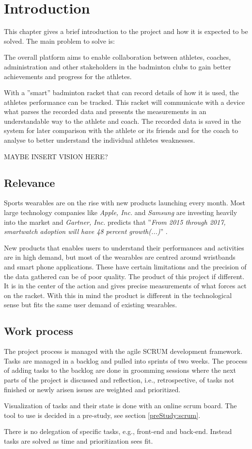 \chapter{Introduction}
This chapter gives a brief introduction to the project and how it is expected to be solved.
The main problem to solve is:


The overall platform aims to enable collaboration between athletes, coaches, administration and other stakeholders in the badminton clubs to gain better achievements and progress for the athletes.

With a ''smart'' badminton racket that can record details of how it is used, the athletes performance can be tracked. 
This racket will communicate with a device what parses the recorded data and presents the measurements in an understandable way to the athlete and coach.
The recorded data is saved in the system for later comparison with the athlete or its friends and for the coach to analyse to better understand the individual athletes weaknesses.

MAYBE INSERT VISION HERE?

\section*{Relevance}
Sports wearables are on the rise with new products launching every month. 
Most large technology companies like \textit{Apple, Inc.} and \textit{Samsung} are investing heavily into the market and \textit{Gartner, Inc.} predicts that ''\textit{From 2015 through 2017, smartwatch adoption will have 48 percent growth(...)}'' \citep{introduction:relevance:gartner}.

New products that enables users to understand their performances and activities are in high demand, but most of the wearables are centred around wristbands and smart phone applications. 
These have certain limitations and the precision of the data gathered can be of poor quality.
The product of this project if different. 
It is in the center of the action and gives precise measurements of what forces act on the racket.
With this in mind the product is different in the technological sense but fits the same user demand of existing wearables.

\section*{Work process}
The project process is managed with the agile SCRUM development framework. 
Tasks are managed in a backlog and pulled into sprints of two weeks. 
The process of adding tasks to the backlog are done in groomming sessions where the next parts of the project is discussed and reflection, i.e., retrospective, of tasks not finished or newly arisen issues are weighted and prioritized.

Visualization of tasks and their state is done with an online scrum board. 
The tool to use is decided in a pre-study, see section \ref{preStudy:scrum}.

There is no delegation of specific tasks, e.g., front-end and back-end. 
Instead tasks are solved as time and prioritization sees fit.
